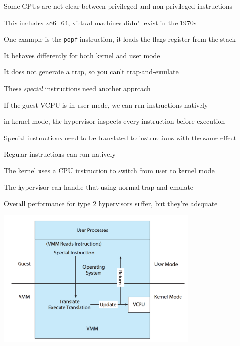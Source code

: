   \begin{slide}
    

    Some CPUs are not clear between privileged and non-privileged instructions

    \leftspace{}This includes x86\_64, virtual machines didn't exist in the 1970s
    \medskip

    One example is the \texttt{popf} instruction, it loads the flags register
    from the stack

    \leftspace{}It behaves differently for both kernel and user mode
    \medskip

    It does not generate a trap, so you can't trap-and-emulate

    \leftspace{}These \textit{special} instructions need another approach

  \end{slide}

  \begin{slide}
    

    If the guest VCPU is in user mode, we can run instructions natively

    \leftspace{}in kernel mode, the hypervisor inspects every instruction
                 before execution
    \medskip

    Special instructions need to be translated to instructions with the same
    effect

    \leftspace{}Regular instructions can run natively
    \medskip

    The kernel uses a CPU instruction to switch from user to kernel mode

    \leftspace{}The hypervisor can handle that using normal trap-and-emulate
    \medskip

    Overall performance for type 2 hypervisors suffer, but they're adequate

  \end{slide}

  \begin{slide}
    

    \begin{center}
      \includegraphics[width=0.75\textwidth]{binary-translation.png}
    \end{center}

  \end{slide}

